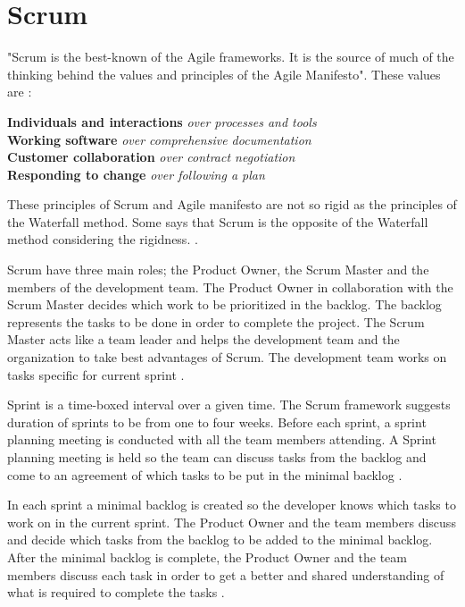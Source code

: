 \documentclass[UKenglish]{ifimaster}  %
\begin{document}
\section {Scrum}
\label{sec:Scrum}
"Scrum is the best-known of the Agile frameworks. It is the source of much of the thinking behind the values and principles of the Agile Manifesto"\parencite{Scrum}. These values are \parencite{Scrum}:

\begin{center}
\textbf{Individuals and interactions}  \textit{over processes and tools} \\
\textbf{Working software} \textit{over comprehensive documentation} \\
\textbf{Customer collaboration} \textit{over contract negotiation} \\
\textbf{Responding to change} \textit{over following a plan} \\
\end{center}

These principles of Scrum and Agile manifesto are not so rigid as the principles of the Waterfall method. Some says that Scrum is the opposite of the Waterfall method considering the rigidness.  \parencite{cocco2011simulating}. 

Scrum have three main roles; the Product Owner, the Scrum Master and the members of the development team. The Product Owner in collaboration with the Scrum Master decides which work to be prioritized in the backlog. The backlog represents the tasks to be done in order to complete the project. The Scrum Master acts like a team leader and helps the development team and the organization to take best advantages of Scrum. The development team works on tasks specific for current sprint \parencite{Scrum}.

Sprint is a time-boxed interval over a given time. The Scrum framework suggests duration of sprints to be from one to four weeks. Before each sprint, a sprint planning meeting is conducted with all the team members attending.  A Sprint planning meeting is held so the team can discuss tasks from the backlog and come to an agreement of which tasks to be put in the minimal backlog \parencite{Scrum}.

In each sprint a minimal backlog is created so the developer knows which tasks to work on in the current sprint. The Product Owner and the team members discuss and decide which tasks from the backlog to be added to the minimal backlog. After the minimal backlog is complete, the Product Owner and the team members discuss each task in order to get a better and shared understanding of what is required to complete the tasks \parencite{Scrum}. 
\end{document}
